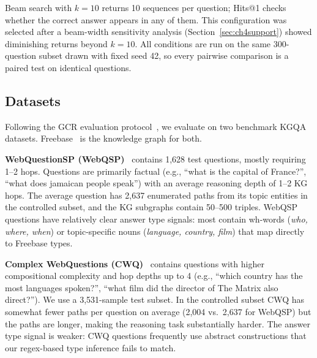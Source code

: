Beam search with $k{=}10$ returns 10 sequences per question; Hits@1 checks whether the correct answer appears in any of them. This configuration was selected after a beam-width sensitivity analysis (Section~\ref{sec:ch4support}) showed diminishing returns beyond $k{=}10$. All conditions are run on the same 300-question subset drawn with fixed seed 42, so every pairwise comparison is a paired test on identical questions.

\subsection{Datasets}
\label{sec:ch4datasets}

Following the GCR evaluation protocol~\citep{luo2025-graph-constrained-reasoning}, we evaluate on two benchmark KGQA datasets. Freebase~\citep{bollacker2008freebase} is the knowledge graph for both.

\textbf{WebQuestionSP (WebQSP)}~\citep{yih2016websqp} contains 1,628 test questions, mostly requiring 1--2 hops. Questions are primarily factual (e.g., ``what is the capital of France?'', ``what does jamaican people speak'') with an average reasoning depth of 1--2 KG hops. The average question has 2,637 enumerated paths from its topic entities in the controlled subset, and the KG subgraphs contain 50--500 triples. WebQSP questions have relatively clear answer type signals: most contain wh-words (\textit{who, where, when}) or topic-specific nouns (\textit{language, country, film}) that map directly to Freebase types.

\textbf{Complex WebQuestions (CWQ)}~\citep{talmor2018cwq} contains questions with higher compositional complexity and hop depths up to 4 (e.g., ``which country has the most languages spoken?'', ``what film did the director of The Matrix also direct?''). We use a 3,531-sample test subset. In the controlled subset CWQ has somewhat fewer paths per question on average (2,004 vs.\ 2,637 for WebQSP) but the paths are longer, making the reasoning task substantially harder. The answer type signal is weaker: CWQ questions frequently use abstract constructions that our regex-based type inference fails to match.

